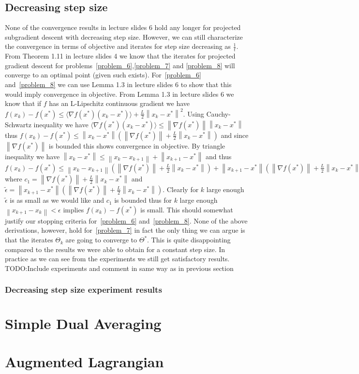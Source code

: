 \documentclass{article}
\newcommand{\0}{\mathrm{0}}
\newcommand{\1}{\mathrm{1}}
\newcommand{\norm}[1]{\left\| #1 \right\|}
\begin{document}
\subsection{Decreasing step size}
None of the convergence results in lecture slides 6 hold any longer for projected subgradient descent with decreasing step size. However, we can still characterize the convergence in terms of objective and iterates for step size decreasing as $\frac{1}{t}$. From Theorem 1.11 in lecture slides 4 we know that the iterates for projected gradient descent for problems~\ref{problem_6},\ref{problem_7} and \ref{problem_8} will converge to an optimal point (given such exists). For~\ref{problem_6} and~\ref{problem_8} we can use Lemma 1.3 in lecture slides 6 to show that this would imply convergence in objective. From Lemma 1.3 in lecture slides 6 we know that if $f$ has an L-Lipschitz continuous gradient we have $f(x_k) - f(x^*) \leq \langle\nabla f(x^*)(x_k-x^*)\rangle + \frac{L}{2}\norm{x_k-x^*}^2$. Using Cauchy-Schwartz inequality we have $\langle\nabla f(x^*)(x_k-x^*)\rangle \leq \norm{\nabla f(x^*)}\norm{x_k-x^*}$ thus $f(x_k) - f(x^*) \leq \norm{x_k-x^*}\left(\norm{\nabla f(x^*)} + \frac{L}{2}\norm{x_k-x^*}\right)$ and since $\norm{\nabla f(x^*)}$ is bounded this shows convergence in objective. By triangle inequality we have $\norm{x_k-x^*} \leq \norm{x_k-x_{k+1}} + \norm{x_{k+1} - x^*}$ and thus $f(x_k) - f(x^*) \leq \norm{x_k-x_{k+1}}(\norm{\nabla f(x^*)} + \frac{L}{2}\norm{x_k-x^*}) + \norm{x_{k+1}-x^*}\left(\norm{\nabla f(x^*)} + \frac{L}{2}\norm{x_k-x^*}\right) \leq \norm{x_k-x_{k+1}}c_1 + \tilde{\epsilon}$ where $c_1 = \norm{\nabla f(x^*)}  + \frac{L}{2}\norm{x_k-x^*}$ and $\tilde{\epsilon} = \norm{x_{k+1}-x^*}\left(\norm{\nabla f(x^*)} + \frac{L}{2}\norm{x_k-x^*}\right)$. Clearly for $k$ large enough $\tilde{\epsilon}$ is as small as we would like and $c_1$ is bounded thus for $k$ large enough $\norm{x_{k+1} - x_k} < \epsilon$ implies $f(x_k) - f(x^*)$ is small. This should somewhat justify our stopping criteria for~\ref{problem_6} and~\ref{problem_8}. None of the above derivations, however, hold for~\ref{problem_7} in fact the only thing we can argue is that the iterates $\Theta_k$ are going to converge to $\Theta^*$. This is quite disappointing compared to the results we were able to obtain for a constant step size. In practice as we can see from the experiments we still get satisfactory results.
TODO:Include experiments and comment in same way as in previous section

\subsubsection{Decreasing step size experiment results}



\section{Simple Dual Averaging}
\section{Augmented Lagrangian}


\end{document}
